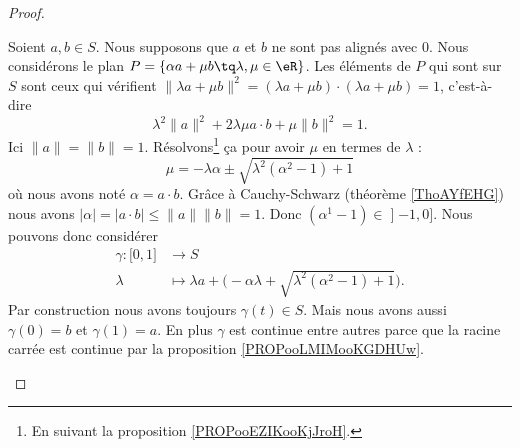 \begin{proof}
\begin{subproof}
		Soient \( a,b\in S\). Nous supposons que \( a\) et \( b\) ne sont pas alignés avec \( 0\). Nous considérons le plan \( P=\{ \alpha a+\mu b\tq \lambda,\mu\in \eR \}\). Les éléments de \( P\) qui sont sur \( S\) sont ceux qui vérifient \( \| \lambda a+\mu b \|^2=(\lambda a+\mu b)\cdot (\lambda a+\mu b)=1\), c'est-à-dire
		\begin{equation}
			\lambda^2\| a \|^2+2\lambda\mu a\cdot b+\mu\| b \|^2=1.
		\end{equation}
		Ici \( \| a \|=\| b \|=1\). Résolvons\footnote{En suivant la proposition \ref{PROPooEZIKooKjJroH}.} ça pour avoir \( \mu\) en termes de \( \lambda\) :
		\begin{equation}
			\mu=- \lambda \alpha\pm\sqrt{ \lambda^2(\alpha^2-1)+1 }
		\end{equation}
		où nous avons noté \( \alpha=a\cdot b\). Grâce à Cauchy-Schwarz (théorème \ref{ThoAYfEHG}) nous avons \( | \alpha |= | a\cdot b |\leq \| a \|\| b \|=1\). Donc \( (\alpha^1-1)\in \mathopen] -1,0\mathclose]\). Nous pouvons donc considérer
		\begin{equation}
			\begin{aligned}
				\gamma\colon \mathopen[ 0,1\mathclose] & \to S                                                                           \\
				\lambda                                & \mapsto \lambda a+\big( -\alpha \lambda+\sqrt{ \lambda^2(\alpha^2-1)+1 } \big).
			\end{aligned}
		\end{equation}
		Par construction nous avons toujours \( \gamma(t)\in S\). Mais nous avons aussi \( \gamma(0)=b\) et \( \gamma(1)=a\). En plus \( \gamma\) est continue entre autres parce que la racine carrée est continue par la proposition \ref{PROPooLMIMooKGDHUw}.


\end{subproof}
\end{proof}
